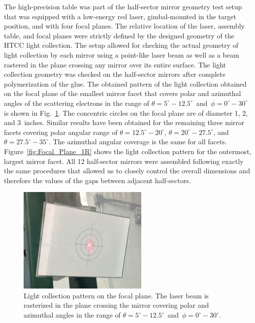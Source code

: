 The high-precision table was part of the half-sector mirror geometry test setup that was equipped with a
low-energy red laser, gimbal-mounted in the target position, and with four focal planes. The relative location of the
laser, assembly table, and focal planes were strictly defined by the designed geometry of the HTCC light collection.
The setup allowed for checking the actual geometry of light collection by each mirror using a point-like laser beam
as well as a beam rastered in the plane crossing any mirror over its entire surface. The light collection geometry
was checked on the half-sector mirrors after complete polymerization of the glue. The obtained pattern of the
light collection obtained on the focal plane of the smallest mirror facet that covers polar and azimuthal angles of
the scattering electrons in the range of $\theta = 5^\circ - 12.5^\circ$\, and\, $\phi = 0^\circ - 30^\circ$ is shown in
Fig.~\ref{fig:Focal_Plane_4}. The concentric circles on the focal plane are of diameter 1, 2, and 3~inches. Similar
results have been obtained for the remaining three mirror facets covering polar angular range of
$\theta = 12.5^\circ - 20^\circ$, $\theta = 20^\circ - 27.5^\circ$, and $\theta = 27.5^\circ - 35^\circ$. The
azimuthal angular coverage is the same for all facets. Figure~\ref{fig:Focal_Plane_1R} shows the light collection
pattern for the outermost, largest mirror facet. All 12 half-sector mirrors were assembled following exactly
the same procedures that allowed us to closely control the overall dimensions and therefore the values of the gaps
between adjacent half-sectors. 

\begin{figure}[ht]
    \centering
    \includegraphics[width=0.90\linewidth]{images/Focal_Plane_4.jpg}
    \caption{Light collection pattern on the focal plane. The laser beam is rasterized in the plane crossing the mirror
      covering polar and azimuthal angles in the range of $\theta = 5^\circ - 12.5^\circ$\, and\,
      $\phi = 0^\circ - 30^\circ$.}
    \label{fig:Focal_Plane_4}
\end{figure}

